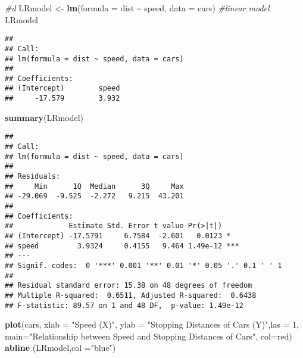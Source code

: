 \documentclass[
]{article}
\newenvironment{Shaded}{\begin{snugshade}}{\end{snugshade}}
\newcommand{\AttributeTok}[1]{\textcolor[rgb]{0.13,0.29,0.53}{#1}}
\newcommand{\CommentTok}[1]{\textcolor[rgb]{0.56,0.35,0.01}{\textit{#1}}}
\newcommand{\DecValTok}[1]{\textcolor[rgb]{0.00,0.00,0.81}{#1}}
\newcommand{\FunctionTok}[1]{\textcolor[rgb]{0.13,0.29,0.53}{\textbf{#1}}}
\newcommand{\NormalTok}[1]{#1}
\newcommand{\OtherTok}[1]{\textcolor[rgb]{0.56,0.35,0.01}{#1}}
\newcommand{\SpecialCharTok}[1]{\textcolor[rgb]{0.81,0.36,0.00}{\textbf{#1}}}
\newcommand{\StringTok}[1]{\textcolor[rgb]{0.31,0.60,0.02}{#1}}
\begin{document}
\begin{Shaded}
\begin{Highlighting}[]
\CommentTok{\#d}
\NormalTok{LRmodel }\OtherTok{\textless{}{-}} \FunctionTok{lm}\NormalTok{(}\AttributeTok{formula =}\NormalTok{ dist }\SpecialCharTok{\textasciitilde{}}\NormalTok{ speed, }\AttributeTok{data =}\NormalTok{ cars) }\CommentTok{\#linear model}
\NormalTok{LRmodel}
\end{Highlighting}
\end{Shaded}

\begin{verbatim}
## 
## Call:
## lm(formula = dist ~ speed, data = cars)
## 
## Coefficients:
## (Intercept)        speed  
##     -17.579        3.932
\end{verbatim}

\begin{Shaded}
\begin{Highlighting}[]
\FunctionTok{summary}\NormalTok{(LRmodel)}
\end{Highlighting}
\end{Shaded}

\begin{verbatim}
## 
## Call:
## lm(formula = dist ~ speed, data = cars)
## 
## Residuals:
##     Min      1Q  Median      3Q     Max 
## -29.069  -9.525  -2.272   9.215  43.201 
## 
## Coefficients:
##             Estimate Std. Error t value Pr(>|t|)    
## (Intercept) -17.5791     6.7584  -2.601   0.0123 *  
## speed         3.9324     0.4155   9.464 1.49e-12 ***
## ---
## Signif. codes:  0 '***' 0.001 '**' 0.01 '*' 0.05 '.' 0.1 ' ' 1
## 
## Residual standard error: 15.38 on 48 degrees of freedom
## Multiple R-squared:  0.6511, Adjusted R-squared:  0.6438 
## F-statistic: 89.57 on 1 and 48 DF,  p-value: 1.49e-12
\end{verbatim}

\begin{Shaded}
\begin{Highlighting}[]
\FunctionTok{plot}\NormalTok{(cars, }\AttributeTok{xlab =} \StringTok{"Speed (X)"}\NormalTok{, }\AttributeTok{ylab =} \StringTok{"Stopping Distances of Cars (Y)"}\NormalTok{,}\AttributeTok{las =} \DecValTok{1}\NormalTok{,}
     \AttributeTok{main=}\StringTok{"Relationship between Speed and Stopping Distances of Cars"}\NormalTok{,}
     \AttributeTok{col=}\StringTok{\textquotesingle{}red\textquotesingle{}}\NormalTok{)}
\FunctionTok{abline}\NormalTok{ (LRmodel,}\AttributeTok{col =}\StringTok{"blue"}\NormalTok{)}
\end{Highlighting}
\end{Shaded}
\end{document}
